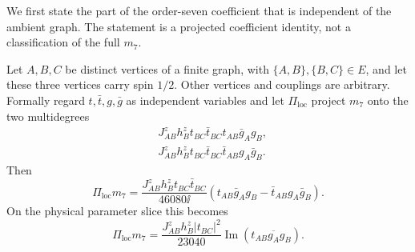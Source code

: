 We first state the part of the order-seven coefficient that is independent
of the ambient graph.  The statement is a projected coefficient identity,
not a classification of the full $m_7$.

\begin{proposition}
\label{prop:local-transverse-sector}
Let $A,B,C$ be distinct vertices of a finite graph, with
$\{A,B\},\{B,C\}\in E$, and let these three vertices carry spin $1/2$.
Other vertices and couplings are arbitrary.  Formally regard
$t,\bar t,g,\bar g$ as independent variables and let
$\Pi_{\mathrm{loc}}$ project $m_7$ onto the two multidegrees
\begin{align}
 &J^z_{AB}h_B^z t_{BC}\bar t_{BC}t_{AB}\bar g_Ag_B,
 \nonumber\\
 &J^z_{AB}h_B^z t_{BC}\bar t_{BC}\bar t_{AB}g_A\bar g_B.
 \label{eq:local-transverse-multidegrees}
\end{align}
Then
\begin{equation}
 \Pi_{\mathrm{loc}}m_7
 =\frac{J^z_{AB}h_B^z t_{BC}\bar t_{BC}}{46080\ii}
 \left(t_{AB}\bar g_Ag_B-\bar t_{AB}g_A\bar g_B\right).
 \label{eq:local-transverse-formal}
\end{equation}
On the physical parameter slice this becomes
\begin{equation}
 \boxed{
 \Pi_{\mathrm{loc}}m_7
 =\frac{J^z_{AB}h_B^z|t_{BC}|^2}{23040}
 \operatorname{Im}\!\left(t_{AB}\overline{g_A}g_B\right).}
 \label{eq:local-transverse-physical}
\end{equation}
\end{proposition}

